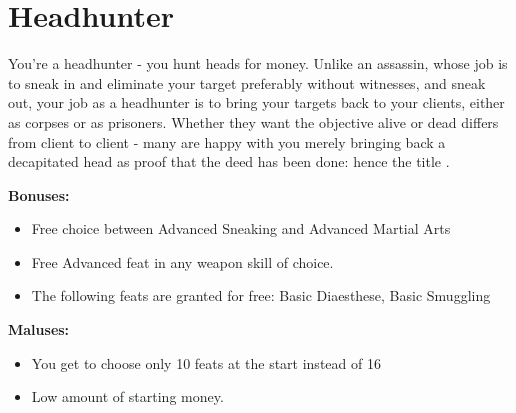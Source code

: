 \section{Headhunter}
You're a headhunter - you hunt heads for money. Unlike an assassin, whose job is to sneak in and eliminate your target preferably without witnesses, and sneak out, your job as a headhunter is to bring your targets back to your clients, either as corpses or as prisoners. Whether they want the objective alive or dead differs from client to client - many are happy with you merely bringing back a decapitated head as proof that the deed has been done: hence the title .

\textbf{Bonuses:}
\begin{itemize}
	\item Free choice between Advanced Sneaking and Advanced Martial Arts
	\item Free Advanced feat in any weapon skill of choice.
	\item The following feats are granted for free: Basic Diaesthese, Basic Smuggling
\end{itemize}


\textbf{Maluses:}
\begin{itemize}
	\item You get to choose only 10 feats at the start instead of 16
	\item Low amount of starting money.
\end{itemize}
